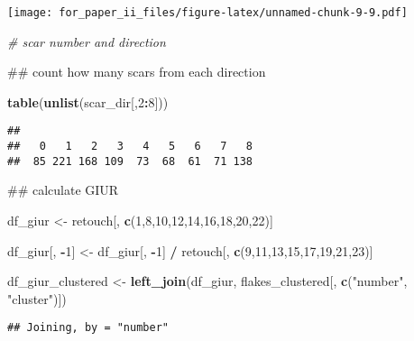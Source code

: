\documentclass[]{article}
\newenvironment{Shaded}{\begin{snugshade}}{\end{snugshade}}
\newcommand{\KeywordTok}[1]{\textcolor[rgb]{0.13,0.29,0.53}{\textbf{#1}}}
\newcommand{\DecValTok}[1]{\textcolor[rgb]{0.00,0.00,0.81}{#1}}
\newcommand{\StringTok}[1]{\textcolor[rgb]{0.31,0.60,0.02}{#1}}
\newcommand{\CommentTok}[1]{\textcolor[rgb]{0.56,0.35,0.01}{\textit{#1}}}
\newcommand{\OperatorTok}[1]{\textcolor[rgb]{0.81,0.36,0.00}{\textbf{#1}}}
\newcommand{\NormalTok}[1]{#1}
\begin{document}
\texttt{[image: for\_paper\_ii\_files/figure-latex/unnamed-chunk-9-9.pdf]}

\begin{Shaded}
\begin{Highlighting}[]
\CommentTok{# scar number and direction}

\NormalTok{## count how many scars from each direction}

\KeywordTok{table}\NormalTok{(}\KeywordTok{unlist}\NormalTok{(scar_dir[,}\DecValTok{2}\OperatorTok{:}\DecValTok{8}\NormalTok{]))}
\end{Highlighting}
\end{Shaded}

\begin{verbatim}
## 
##   0   1   2   3   4   5   6   7   8 
##  85 221 168 109  73  68  61  71 138
\end{verbatim}

\begin{Shaded}
\begin{Highlighting}[]
\NormalTok{## calculate GIUR}

\NormalTok{df_giur <-}\StringTok{ }\NormalTok{retouch[, }\KeywordTok{c}\NormalTok{(}\DecValTok{1}\NormalTok{,}\DecValTok{8}\NormalTok{,}\DecValTok{10}\NormalTok{,}\DecValTok{12}\NormalTok{,}\DecValTok{14}\NormalTok{,}\DecValTok{16}\NormalTok{,}\DecValTok{18}\NormalTok{,}\DecValTok{20}\NormalTok{,}\DecValTok{22}\NormalTok{)]}

\NormalTok{df_giur[, }\OperatorTok{-}\DecValTok{1}\NormalTok{] <-}\StringTok{ }\NormalTok{df_giur[, }\OperatorTok{-}\DecValTok{1}\NormalTok{] }\OperatorTok{/}\StringTok{ }\NormalTok{retouch[, }\KeywordTok{c}\NormalTok{(}\DecValTok{9}\NormalTok{,}\DecValTok{11}\NormalTok{,}\DecValTok{13}\NormalTok{,}\DecValTok{15}\NormalTok{,}\DecValTok{17}\NormalTok{,}\DecValTok{19}\NormalTok{,}\DecValTok{21}\NormalTok{,}\DecValTok{23}\NormalTok{)]}

\NormalTok{df_giur_clustered <-}\StringTok{ }\KeywordTok{left_join}\NormalTok{(df_giur, flakes_clustered[, }\KeywordTok{c}\NormalTok{(}\StringTok{"number"}\NormalTok{, }\StringTok{"cluster"}\NormalTok{)])}
\end{Highlighting}
\end{Shaded}

\begin{verbatim}
## Joining, by = "number"
\end{verbatim}
\end{document}
